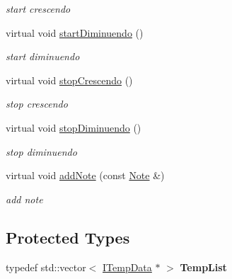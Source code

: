 \begin{DoxyCompactItemize}
\begin{DoxyCompactList}\small\item\em start crescendo \end{DoxyCompactList}\item 
\hypertarget{classsinsy_1_1TempScore_addae25576d24053a0270f2ed98242d61}{virtual void \hyperlink{classsinsy_1_1TempScore_addae25576d24053a0270f2ed98242d61}{start\-Diminuendo} ()}\label{classsinsy_1_1TempScore_addae25576d24053a0270f2ed98242d61}

\begin{DoxyCompactList}\small\item\em start diminuendo \end{DoxyCompactList}\item 
\hypertarget{classsinsy_1_1TempScore_a4abb9125e2f1815aa13c5ca418f9cc9b}{virtual void \hyperlink{classsinsy_1_1TempScore_a4abb9125e2f1815aa13c5ca418f9cc9b}{stop\-Crescendo} ()}\label{classsinsy_1_1TempScore_a4abb9125e2f1815aa13c5ca418f9cc9b}

\begin{DoxyCompactList}\small\item\em stop crescendo \end{DoxyCompactList}\item 
\hypertarget{classsinsy_1_1TempScore_a7cf004fbf86eb6612aa560e7f0304d7b}{virtual void \hyperlink{classsinsy_1_1TempScore_a7cf004fbf86eb6612aa560e7f0304d7b}{stop\-Diminuendo} ()}\label{classsinsy_1_1TempScore_a7cf004fbf86eb6612aa560e7f0304d7b}

\begin{DoxyCompactList}\small\item\em stop diminuendo \end{DoxyCompactList}\item 
\hypertarget{classsinsy_1_1TempScore_a6976fe57e1a9a0b4c6861841a3f130bd}{virtual void \hyperlink{classsinsy_1_1TempScore_a6976fe57e1a9a0b4c6861841a3f130bd}{add\-Note} (const \hyperlink{classsinsy_1_1Note}{\-Note} \&)}\label{classsinsy_1_1TempScore_a6976fe57e1a9a0b4c6861841a3f130bd}

\begin{DoxyCompactList}\small\item\em add note \end{DoxyCompactList}\end{DoxyCompactItemize}
\subsection*{\-Protected \-Types}
\begin{DoxyCompactItemize}
\item 
\hypertarget{classsinsy_1_1TempScore_abf2f3b265a49049bd2728a6b0e7ea8cd}{typedef std\-::vector$<$ \hyperlink{classsinsy_1_1TempScore_1_1ITempData}{\-I\-Temp\-Data} $\ast$ $>$ {\bfseries \-Temp\-List}}\label{classsinsy_1_1TempScore_abf2f3b265a49049bd2728a6b0e7ea8cd}

\end{DoxyCompactItemize}
